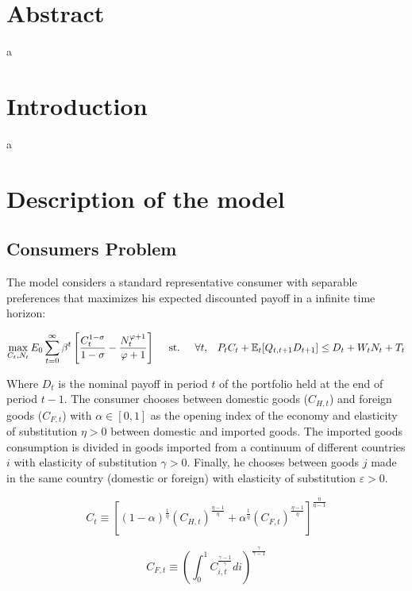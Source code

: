 \documentclass{article}
\newcommand{\Et}{\mathbb{E}_t}
\begin{document}
\section*{Abstract}
a

\section{Introduction}
a

\section{Description of the model}

\subsection{Consumers Problem}
The model considers a standard representative consumer with separable preferences that maximizes his expected discounted payoff in a infinite time horizon:

\begin{equation}
    \max_{C_t, N_t} E_0 \sum^\infty_{t=0} \beta^t \left[\frac{C_t^{1-\sigma}}{1-\sigma} - \frac{N_t^{\varphi+1}}{\varphi+1} \right] \hspace{1em}  \textrm{ st. } \hspace{1em} \forall t, \hspace{0.8em} P_t C_t + \Et[Q_{t,t+1} D_{t+1}] \leq D_t +  W_t N_t + T_t
\end{equation}

Where $D_t$ is the nominal payoff in period $t$ of the portfolio held at the end of period $t-1$. The consumer chooses between domestic goods ($C_{H,t}$) and foreign goods ($C_{F,t}$) with $\alpha \in [0,1]$ as the opening index of the economy and elasticity of substitution $\eta > 0$ between domestic and imported goods. The imported goods consumption is divided in goods imported from a continuum of different countries $i$ with elasticity of substitution $\gamma > 0$. Finally, he chooses between goods $j$ made in the same country (domestic or foreign) with elasticity of substitution $\varepsilon > 0$.

\begin{equation}
    C_t \equiv \left[ (1-\alpha)^{\frac{1}{\eta}} (C_{H,t})^{\frac{\eta-1}{\eta}} + \alpha^{\frac{1}{\eta}} (C_{F,t})^{\frac{\eta-1}{\eta}} \right]^{\frac{\eta}{\eta-1}}
\end{equation}

\begin{equation}
    C_{F,t} \equiv \left( \int^1_0 C_{i,t}^{\frac{\gamma-1}{\gamma}} di \right)^{\frac{\gamma}{\gamma-1}}
\end{equation}
\end{document}
